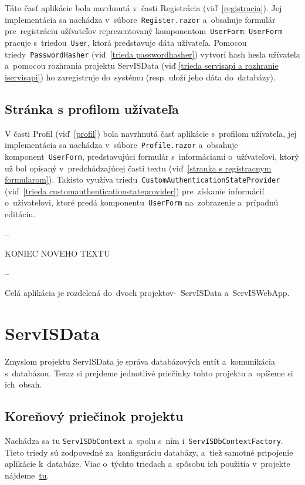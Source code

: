 Táto časť aplikácie bola navrhnutá v~časti Registrácia (viď~\ref{registracia}). Jej implementácia sa nachádza v~súbore~\verb|Register.razor| a~obsahuje formulár pre~registráciu užívateľov reprezentovaný komponentom~\verb|UserForm|. \verb|UserForm| pracuje s~triedou~\verb|User|, ktorá predstavuje dáta užívateľa. Pomocou triedy~\verb|PasswordHasher| (viď~\ref{trieda passwordhasher}) vytvorí hash hesla užívateľa a~pomocou rozhrania projektu ServISData (viď \ref{trieda servisapi a rozhranie iservisapi}) ho zaregistruje do~systému (resp. uloží jeho dáta do~databázy).

\subsection{Stránka s profilom užívateľa}

V časti Profil (viď~\ref{profil}) bola navrhnutá časť aplikácie s~profilom užívateľa, jej implementácia sa nachádza v~súbore~\verb|Profile.razor| a~obsahuje komponent~\verb|UserForm|, predstavujúci formulár s~informáciami o~užívateľovi, ktorý už bol opísaný v~predchádzajúcej časti textu (viď~\ref{stranka s registracnym formularom}). Takisto využíva triedu~\verb|CustomAuthenticationStateProvider| (viď~\ref{trieda customauthenticationstateprovider}) pre~získanie informácií o~užívateľovi, ktoré predá komponentu~\verb|UserForm| na~zobrazenie a~prípadnú editáciu.

\iffalse

--

KONIEC NOVEHO TEXTU

--

Celá aplikácia je rozdelená do~dvoch projektov-~ServISData a~ServISWebApp.

\section{ServISData}

Zmyslom projektu ServISData je správa databázových entít a~komunikácia s~databázou. Teraz si prejdeme jednotlivé priečinky tohto projektu a~opíšeme si ich~obsah.

\subsection{Koreňový priečinok projektu}

Nachádza sa tu \verb|ServISDbContext| a~spolu s~ním i~\verb|ServISDbContextFactory|. Tieto triedy sú zodpovedné za~konfiguráciu databázy, a~tiež samotné pripojenie aplikácie k~databáze. Viac o~týchto triedach a~spôsobu ich použitia v~projekte nájdeme~\href{https://learn.microsoft.com/en-us/ef/core/dbcontext-configuration/\#using-a-dbcontext-factory-eg-for-blazor}{tu}.

